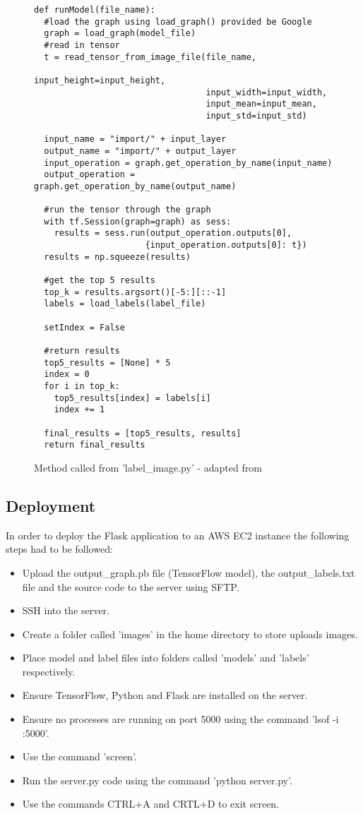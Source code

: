 \begin{figure}[h]
\caption{Method called from 'label\_image.py' - adapted from \parencite{retrainInception}}
\label{lst:labelBackend}
\begin{lstlisting}[style=Python]
def runModel(file_name):
  #load the graph using load_graph() provided be Google
  graph = load_graph(model_file)
  #read in tensor
  t = read_tensor_from_image_file(file_name,
                                  input_height=input_height,
                                  input_width=input_width,
                                  input_mean=input_mean,
                                  input_std=input_std)

  input_name = "import/" + input_layer
  output_name = "import/" + output_layer
  input_operation = graph.get_operation_by_name(input_name)
  output_operation = graph.get_operation_by_name(output_name)

  #run the tensor through the graph
  with tf.Session(graph=graph) as sess:
    results = sess.run(output_operation.outputs[0],
                      {input_operation.outputs[0]: t})
  results = np.squeeze(results)

  #get the top 5 results
  top_k = results.argsort()[-5:][::-1]
  labels = load_labels(label_file)

  setIndex = False

  #return results
  top5_results = [None] * 5
  index = 0
  for i in top_k:
    top5_results[index] = labels[i]
    index += 1

  final_results = [top5_results, results]
  return final_results
\end{lstlisting}
\end{figure}

\tocless\subsection{Deployment}
In order to deploy the Flask application to an AWS EC2 instance the following steps had to be followed:

\begin{itemize}
    \item{Upload the output\_graph.pb file (TensorFlow model), the output\_labels.txt file and the source code to the server using SFTP.}
    \item{SSH into the server.}
    \item{Create a folder called 'images' in the home directory to store uploads images.}
    \item{Place model and label files into folders called 'models' and 'labels' respectively.}
    \item{Ensure TensorFlow, Python and Flask are installed on the server.}
    \item{Ensure no processes are running on port 5000 using the command 'lsof -i :5000'.}
    \item{Use the command 'screen'.}
    \item{Run the server.py code using the command 'python server.py'.}
    \item{Use the commands CTRL+A and CRTL+D to exit screen.}
\end{itemize}

